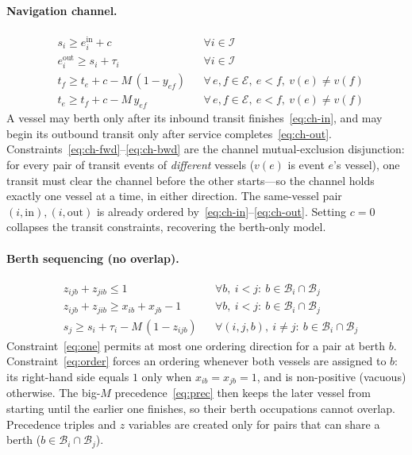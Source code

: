 \documentclass[11pt]{article}
\newcommand{\I}{\mathcal{I}}
\newcommand{\B}{\mathcal{B}}
\newcommand{\Evt}{\mathcal{E}}
\newcommand{\Bi}{\mathcal{B}_i}
\newcommand{\bigM}{M}
\newcommand{\ein}{e^{\mathrm{in}}}
\newcommand{\eout}{e^{\mathrm{out}}}
\begin{document}
\paragraph{Navigation channel.}
\begin{align}
& s_i \ge \ein_i + c && \forall i\in\I \label{eq:ch-in}\\
& \eout_i \ge s_i + \tau_i && \forall i\in\I \label{eq:ch-out}\\
& t_f \ge t_e + c - \bigM\,(1-y_{ef}) && \forall\, e,f\in\Evt,\ e<f,\ v(e)\ne v(f) \label{eq:ch-fwd}\\
& t_e \ge t_f + c - \bigM\,y_{ef} && \forall\, e,f\in\Evt,\ e<f,\ v(e)\ne v(f) \label{eq:ch-bwd}
\end{align}
A vessel may berth only after its inbound transit finishes~\eqref{eq:ch-in}, and
may begin its outbound transit only after service completes~\eqref{eq:ch-out}.
Constraints~\eqref{eq:ch-fwd}--\eqref{eq:ch-bwd} are the channel
mutual-exclusion disjunction: for every pair of transit events of
\emph{different} vessels ($v(e)$ is event $e$'s vessel), one transit must clear
the channel before the other starts---so the channel holds exactly one vessel at
a time, in either direction. The same-vessel pair
$(i,\mathrm{in}),(i,\mathrm{out})$ is already ordered
by~\eqref{eq:ch-in}--\eqref{eq:ch-out}. Setting $c=0$ collapses the transit
constraints, recovering the berth-only model.

\paragraph{Berth sequencing (no overlap).}
\begin{align}
& z_{ijb} + z_{jib} \le 1 && \forall b,\ i<j:\ b\in\Bi\cap\B_j \label{eq:one}\\
& z_{ijb} + z_{jib} \ge x_{ib} + x_{jb} - 1 && \forall b,\ i<j:\ b\in\Bi\cap\B_j \label{eq:order}\\
& s_j \ge s_i + \tau_i - \bigM\,(1 - z_{ijb}) && \forall (i,j,b),\ i\ne j:\ b\in\Bi\cap\B_j \label{eq:prec}
\end{align}
Constraint~\eqref{eq:one} permits at most one ordering direction for a pair at
berth $b$. Constraint~\eqref{eq:order} forces an ordering whenever both vessels
are assigned to $b$: its right-hand side equals $1$ only when $x_{ib}=x_{jb}=1$,
and is non-positive (vacuous) otherwise. The big-$M$ precedence~\eqref{eq:prec}
then keeps the later vessel from starting until the earlier one finishes, so
their berth occupations cannot overlap. Precedence triples and $z$ variables are
created only for pairs that can share a berth ($b\in\Bi\cap\B_j$).
\end{document}

